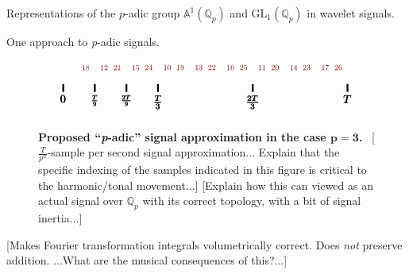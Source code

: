 \documentclass[letterpaper,11pt, reqno]{amsart}
\newtheorem{monodromy theorem}{Monodromy Theorem}[subsection]
\newtheorem{wild conjecture}[theorem]{Wild Conjecture}
\newtheorem{research objectives}{Research objectives}[subsection]
\newtheorem{research question}[theorem]{Research questions}
\newtheorem{aside question}[theorem]{Aside question}
\newtheorem{audio example}[theorem]{\loudspeaker[3] Example}
\newtheorem{blank remark}[theorem]{}
\newtheorem{terminology and comment}[theorem]{Terminology and comment}
\newtheorem{purity hypothesis}[theorem]{Purity hypothesis}
\newtheorem{corollary of the purity hypothesis}[theorem]{Corollary of the purity hypothesis}
\newcommand{\QQ} {{\mathbb Q}}
\numberwithin{equation}{theorem}
\begin{document}
\begin{section}{Representations of the $p$-adic group $\mathbb{A}^{\!1}(\mathbb{Q}_{p})$
and $\text{GL}_{1}(\mathbb{Q}_{p})$
in wavelet signals.}
\begin{subsection}{One approach to {\em p}-adic signals.}
\begin{figure}[ht]
$$\begin{tikzpicture}
	\node[red!50!black!100] at (2/3,.65) {\scalebox{.7}{$\ 18$}};
	\node[red!50!black!100] at (1+1/3,.65) {\scalebox{.7}{$12\ $}};
	\node[red!50!black!100] at (1+2/3,.65) {\scalebox{.7}{$\ 21$}};
	\node[red!50!black!100] at (2+1/3,.65) {\scalebox{.7}{$15\ $}};
	\node[red!50!black!100] at (2+2/3,.65) {\scalebox{.7}{$\ 24$}};
	\node[red!50!black!100] at (3+1/3,.65) {\scalebox{.7}{$10\ $}};
	\node[red!50!black!100] at (3+2/3,.65) {\scalebox{.7}{$\ 19$}};
	\node[red!50!black!100] at (4+1/3,.65) {\scalebox{.7}{$13\ $}};
	\node[red!50!black!100] at (4+2/3,.65) {\scalebox{.7}{$\ 22$}};
	\node[red!50!black!100] at (5+1/3,.65) {\scalebox{.7}{$16\ $}};
	\node[red!50!black!100] at (5+2/3,.65) {\scalebox{.7}{$\ 25$}};
	\node[red!50!black!100] at (6+1/3,.65) {\scalebox{.7}{$11\ $}};
	\node[red!50!black!100] at (6+2/3,.65) {\scalebox{.7}{$\ 20$}};
	\node[red!50!black!100] at (7+1/3,.65) {\scalebox{.7}{$14\ $}};
	\node[red!50!black!100] at (7+2/3,.65) {\scalebox{.7}{$\ 23$}};
	\node[red!50!black!100] at (8+1/3,.65) {\scalebox{.7}{$17\ $}};
	\node[red!50!black!100] at (8+2/3,.65) {\scalebox{.7}{$\ 26$}};
	\draw[black, ultra thick] (0,.125) -- (0,-.125);
	\draw[black, ultra thick] (1,.125) -- (1,-.125);
	\draw[black, ultra thick] (2,.125) -- (2,-.125);
	\draw[black, ultra thick] (3,.125) -- (3,-.125);
	\draw[black, ultra thick] (6,.125) -- (6,-.125);
	\draw[black, ultra thick] (9,.125) -- (9,-.125);
	\node[black] at (0,-.35) {\scalebox{1}{$\pmb{0}$}};
	\node[black] at (1,-.4) {\scalebox{.8}{$\pmb{\frac{T}{9}}$}};
	\node[black] at (2,-.4) {\scalebox{.8}{$\pmb{\frac{2T}{9}}$}};
	\node[black] at (3,-.45) {\scalebox{1}{$\pmb{\frac{T}{3}}$}};
	\node[black] at (6,-.45) {\scalebox{1}{$\pmb{\frac{2T}{3}}$}};
	\node[black] at (9,-.35) {\scalebox{1}{$\pmb{T}$}};
	\end{tikzpicture}
	$$
	\caption{{\bf Proposed ``{\em p}-adic'' signal approximation in the case $\pmb{p=3}$.}\ {\color{red} [$\frac{T}{p^n}$-sample per second signal approximation... Explain that the specific indexing of the samples indicated in this figure is critical to the harmonic/tonal movement...]} {\color{red} [Explain how this can viewed as an actual signal over $\QQ_{p}$ with its correct topology, with a bit of signal inertia...]}}
	\label{figure: p-adic signal proposal}
	\end{figure}
	
{\color{red} [Makes Fourier transformation integrals volumetrically correct. Does {\em not} preserve addition. ...What are the musical consequences of this?...]}


\end{subsection}
\end{section}
\end{document}
